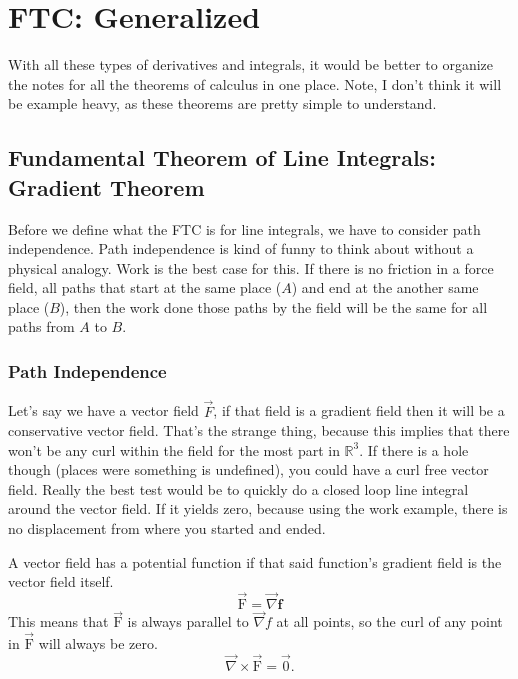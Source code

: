 \chapter{FTC: Generalized}

With all these types of derivatives and integrals, it would be better to organize the notes for all the theorems of calculus in one place. Note, I don't think it will be example heavy, as these theorems are pretty simple to understand. 

\section{Fundamental Theorem of Line Integrals: Gradient Theorem}
Before we define what the FTC is for line integrals, we have to consider path independence. Path independence is kind of funny to think about without a physical analogy. Work is the best case for this. If there is no friction in a force field, all paths that start at the same place ($A$) and end at the another same place ($B$), then the work done those paths by the field will be the same for all paths from $A$ to $B$. 

\subsection{Path Independence}
Let's say we have a vector field $\vec{F}$, if that field is a gradient field then it will be a conservative vector field. That's the strange thing, because this implies that there won't be any curl within the field for the most part in $\mathbb{R}^3$. If there is a hole though (places were something is undefined), you could have a curl free vector field. Really the best test would be to quickly do a closed loop line integral around the vector field. If it yields zero, because using the work example, there is no displacement from where you started and ended.

{
	A vector field has a potential function if that said function's gradient field is the vector field itself. 
	\begin{equation*}
		\vec{\mathrm{F}} = \vec{\nabla}\mathbf{f}
	\end{equation*}
	This means that $\vec{\mathrm{F}}$ is always parallel to $\vec{\nabla}f$ at all points, so the curl of any point in $\vec{\mathrm{F}}$ will always be zero.
	\begin{equation*}
		\vec{\nabla} \times \vec{\mathrm{F}} = \vec{0}.
	\end{equation*}
}

